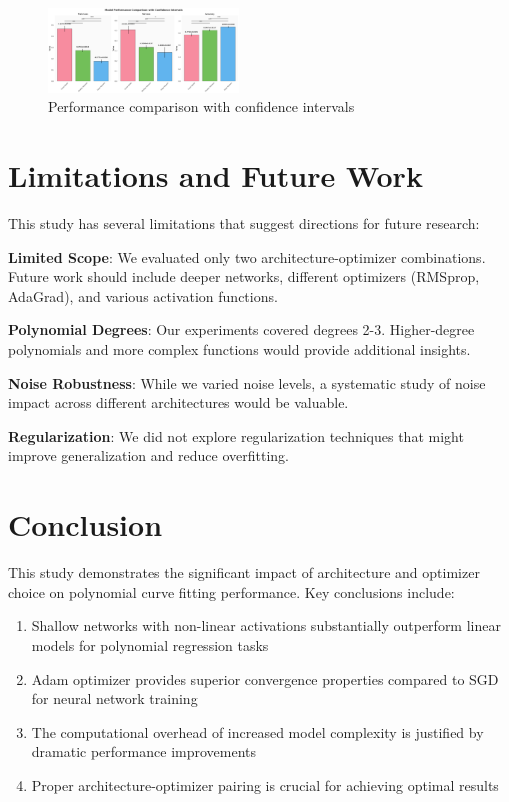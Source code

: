 \documentclass[11pt,twocolumn]{article}
\begin{document}
\begin{figure}[H]
\centering
\includegraphics[width=0.45\textwidth]{images/performance_comparison_ci_demo.png}
\caption{Performance comparison with confidence intervals}
\label{fig:performance_comparison}
\end{figure}

\section{Limitations and Future Work}

This study has several limitations that suggest directions for future research:

\textbf{Limited Scope}: We evaluated only two architecture-optimizer combinations. Future work should include deeper networks, different optimizers (RMSprop, AdaGrad), and various activation functions.

\textbf{Polynomial Degrees}: Our experiments covered degrees 2-3. Higher-degree polynomials and more complex functions would provide additional insights.

\textbf{Noise Robustness}: While we varied noise levels, a systematic study of noise impact across different architectures would be valuable.

\textbf{Regularization}: We did not explore regularization techniques that might improve generalization and reduce overfitting.

\section{Conclusion}

This study demonstrates the significant impact of architecture and optimizer choice on polynomial curve fitting performance. Key conclusions include:

\begin{enumerate}
    \item Shallow networks with non-linear activations substantially outperform linear models for polynomial regression tasks
    \item Adam optimizer provides superior convergence properties compared to SGD for neural network training
    \item The computational overhead of increased model complexity is justified by dramatic performance improvements
    \item Proper architecture-optimizer pairing is crucial for achieving optimal results
\end{enumerate}
\end{document}

